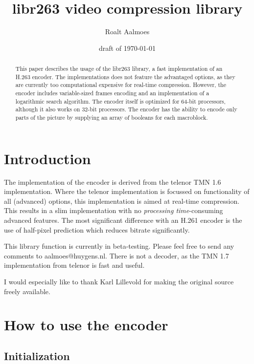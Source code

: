 \documentclass{article}
\title{libr263 video compression library}
\author{Roalt Aalmoes}
\date{draft of \today}
\begin{document}


\maketitle


\begin{abstract} \label{abstract}
 
  This paper describes the usage of the libr263 library, a fast
  implementation of an H.263 encoder. The implementations does not
  feature the advantaged options, as they are currently too
  computational expensive for real-time compression. However, the
  encoder includes variable-sized frames encoding and an
  implementation of a logarithmic search algorithm.  The encoder
  itself is optimized for 64-bit processors, although it also works on
  32-bit processors. The encoder has the ability to encode only parts
  of the picture by supplying an array of booleans for each
  macroblock.

\end{abstract}

\section{Introduction}

The implementation of the encoder is derived from the telenor TMN 1.6
implementation. Where the telenor implementation is focussed on
functionality of all (advanced) options, this implementation is aimed
at real-time compression. This results in a slim implementation with
no \emph{processing time}-consuming advanced features. The most
significant difference with an H.261 encoder is the use of half-pixel
prediction which reduces bitrate significantly.

This library function is currently in beta-testing. Please feel free
to send any comments to aalmoes@huygens.nl. There is not
a decoder, as the TMN 1.7 implementation from telenor is fast and
useful.

I would especially like to thank Karl Lillevold for making the
original source freely available.


\section{How to use the encoder}

\subsection{Initialization}
\end{document}
